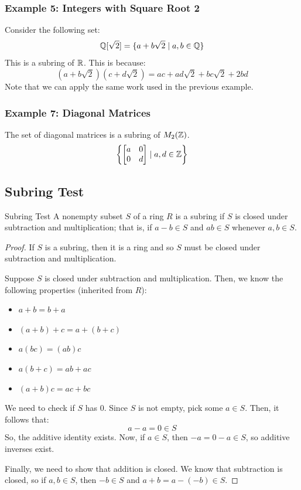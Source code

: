\documentclass[letterpaper]{article}
\begin{document}
\subsubsection{Example 5: Integers with Square Root 2}
Consider the following set: 
\[\mathbb{Q}[\sqrt{2}] = \{a + b\sqrt{2} \mid a, b \in \mathbb{Q}\}\]
This is a subring of $\mathbb{R}$. This is because: 
\[(a + b\sqrt{2})(c + d\sqrt{2}) = ac + ad\sqrt{2} + bc\sqrt{2} + 2bd\]
Note that we can apply the same work used in the previous example. 

\subsubsection{Example 7: Diagonal Matrices}
The set of diagonal matrices is a subring of $M_{2}(\mathbb{Z})$. 
\[\left\{\begin{bmatrix}
    a & 0 \\ 0 & d
\end{bmatrix} \mid a, d \in \mathbb{Z}\right\}\]


\subsection{Subring Test}
\begin{theorem}{Subring Test}{}
    A nonempty subset $S$ of a ring $R$ is a subring if $S$ is closed under subtraction and multiplication; that is, if $a - b \in S$ and $ab \in S$ whenever $a, b \in S$. 
\end{theorem}

\begin{mdframed}[]
    \begin{proof}
        If $S$ is a subring, then it is a ring and so $S$ must be closed under subtraction and multiplication. 

        \bigskip 

        Suppose $S$ is closed under subtraction and multiplication. Then, we know the following properties (inherited from $R$): 
        \begin{itemize}
            \item $a + b = b + a$
            \item $(a + b) + c = a + (b + c)$
            \item $a(bc) = (ab)c$
            \item $a(b + c) = ab + ac$
            \item $(a + b)c = ac + bc$
        \end{itemize}
        We need to check if $S$ has 0. Since $S$ is not empty, pick some $a \in S$. Then, it follows that: 
        \[a - a = 0 \in S\]
        So, the additive identity exists. Now, if $a \in S$, then $-a = 0 - a \in S$, so additive inverses exist. 

        \bigskip 

        Finally, we need to show that addition is closed. We know that subtraction is closed, so if $a, b \in S$, then $-b \in S$ and $a + b = a - (-b) \in S$. 
    \end{proof}
\end{mdframed}
\end{document}
